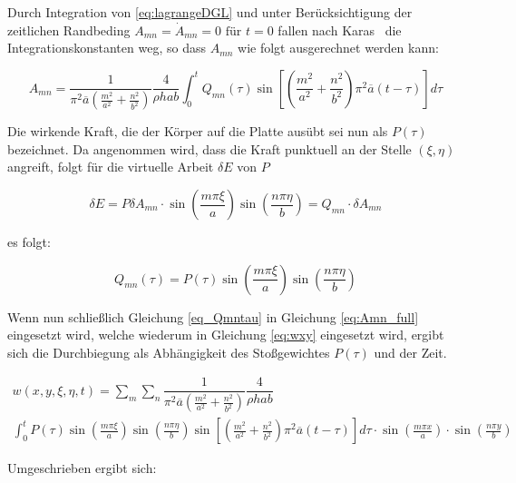 Durch Integration von \ref{eq:lagrangeDGL} und unter Berücksichtigung der zeitlichen Randbeding $A_{mn} = \dot{A}_{mn} = 0 \text{ für } t = 0$ fallen nach Karas~\cite{Karas.1939} die Integrationskonstanten weg, so dass $A_{mn}$ wie folgt ausgerechnet werden kann:

\begin{equation}
A_{mn} = \dfrac{1}{\pi^2 \overline{a}  \left(\frac{m^2}{a^2} + \frac{n^2}{b^2} \right)} \dfrac{4}{\rho h a b} \int_0^t	Q_{mn}(\tau) \sin \left[ \left(\frac{m^2}{a^2} + \frac{n^2}{b^2} \right) \pi^2 \overline{a} (t-\tau)\right] d\tau
\label{eq:Amn_full}
\end{equation}


Die wirkende Kraft, die der Körper auf die Platte ausübt sei nun als $P(\tau)$ bezeichnet. 
Da angenommen wird, dass die Kraft punktuell an der Stelle $(\xi, \eta)$ angreift, folgt für die virtuelle Arbeit $\delta E$ von $P$

\begin{equation}
\delta E = P \delta A_{mn} \cdot \sin \left( \frac{m \pi \xi}{a} \right) \sin \left( \frac{n \pi \eta}{b} \right) = Q_{mn} \cdot \delta A_{mn}
\end{equation} 

es folgt:

\begin{equation}
Q_{mn}(\tau) = P(\tau) \sin \left( \frac{m \pi \xi}{a} \right) \sin \left( \frac{n \pi \eta}{b} \right)
\label{eq_Qmntau}
\end{equation}



Wenn nun schließlich Gleichung \ref{eq_Qmntau} in Gleichung \ref{eq:Amn_full} eingesetzt wird, welche wiederum in Gleichung \ref{eq:wxy} eingesetzt wird, ergibt sich die Durchbiegung als Abhängigkeit des Stoßgewichtes $P(\tau)$ und der Zeit.

\begin{multline}
w(x,y,\xi, \eta, t) = \sum_m \sum_n 
\dfrac{1}{\pi^2 \overline{a}  \left(\frac{m^2}{a^2} + \frac{n^2}{b^2} \right)} \dfrac{4}{\rho h a b} \\ \int_0^t
 P(\tau) \sin \left( \frac{m \pi \xi}{a} \right) \sin \left( \frac{n \pi \eta}{b} \right)
\sin \left[ \left(\frac{m^2}{a^2} + \frac{n^2}{b^2} \right) \pi^2 \overline{a} (t-\tau)\right] d\tau
\cdot \sin\left(\frac{m \pi x}{a}\right) \cdot \sin\left(\frac{n \pi y}{b}\right)
\end{multline}

\newpage

Umgeschrieben ergibt sich:


